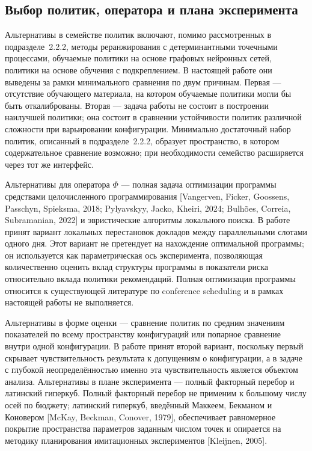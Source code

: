 \subsection{Выбор политик, оператора и плана эксперимента}

Альтернативы в семействе политик включают, помимо рассмотренных в подразделе~2.2.2, методы реранжирования с детерминантными точечными процессами, обучаемые политики на основе графовых нейронных сетей, политики на основе обучения с подкреплением. В настоящей работе они выведены за рамки минимального сравнения по двум причинам. Первая --- отсутствие обучающего материала, на котором обучаемые политики могли бы быть откалиброваны. Вторая --- задача работы не состоит в построении наилучшей политики; она состоит в сравнении устойчивости политик различной сложности при варьировании конфигурации. Минимально достаточный набор политик, описанный в подразделе~2.2.2, образует пространство, в котором содержательное сравнение возможно; при необходимости семейство расширяется через тот же интерфейс.

Альтернативы для оператора $\Phi$ --- полная задача оптимизации программы средствами целочисленного программирования [Vangerven, Ficker, Goossens, Passchyn, Spieksma, 2018; Pylyavskyy, Jacko, Kheiri, 2024; Bulhões, Correia, Subramanian, 2022] и эвристические алгоритмы локального поиска. В работе принят вариант локальных перестановок докладов между параллельными слотами одного дня. Этот вариант не претендует на нахождение оптимальной программы; он используется как параметрическая ось эксперимента, позволяющая количественно оценить вклад структуры программы в показатели риска относительно вклада политики рекомендаций. Полная оптимизация программы относится к существующей литературе по conference scheduling и в рамках настоящей работы не выполняется.

Альтернативы в форме оценки --- сравнение политик по средним значениям показателей по всему пространству конфигураций или попарное сравнение внутри одной конфигурации. В работе принят второй вариант, поскольку первый скрывает чувствительность результата к допущениям о конфигурации, а в задаче с глубокой неопределённостью именно эта чувствительность является объектом анализа. Альтернативы в плане эксперимента --- полный факторный перебор и латинский гиперкуб. Полный факторный перебор не применим к большому числу осей по бюджету; латинский гиперкуб, введённый Маккеем, Бекманом и Коновером [McKay, Beckman, Conover, 1979], обеспечивает равномерное покрытие пространства параметров заданным числом точек и опирается на методику планирования имитационных экспериментов [Kleijnen, 2005].


